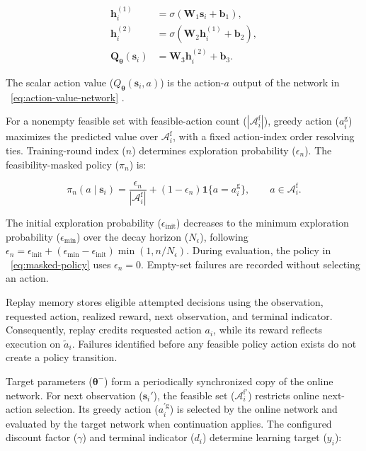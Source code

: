 \documentclass[journal]{IEEEtran}
\providecommand*{\algorithmautorefname}{Algorithm}
\providecommand*{\figureautorefname}{Figure}
\providecommand*{\subfigureautorefname}{Figure}
\providecommand*{\Autoref}[1]{%
  \begingroup
  \def\sectionautorefname{Section}%
  \def\subsectionautorefname{Subsection}%
  \def\subsubsectionautorefname{Subsubsection}%
  \def\algorithmautorefname{Algorithm}%
  \def\figureautorefname{Figure}%
  \def\subfigureautorefname{Figure}%
 ~\autoref{#1}%
  \endgroup
}
\newcommand{\Autoref}[1]{Eq.~\Autoref{#1}}
\begin{document}
\begin{equation}
\label{eq:action-value-network}
\begin{aligned}
\mathbf h_i^{(1)}
&=\sigma(\mathbf W_1\mathbf s_i+\mathbf b_1),\\
\mathbf h_i^{(2)}
&=\sigma(\mathbf W_2\mathbf h_i^{(1)}+\mathbf b_2),\\
\mathbf Q_{\boldsymbol\theta}(\mathbf s_i)
&=\mathbf W_3\mathbf h_i^{(2)}+\mathbf b_3.
\end{aligned}
\end{equation}

The scalar action value (\(Q_{\boldsymbol\theta}(\mathbf s_i,a)\)) is the action-\(a\) output of the network in~\Autoref{eq:action-value-network}.

For a nonempty feasible set with feasible-action count (\(|\mathcal A_i^{\mathrm f}|\)), greedy action (\(a_i^{\mathrm g}\)) maximizes the predicted value over \(\mathcal A_i^{\mathrm f}\), with a fixed action-index order resolving ties. Training-round index (\(n\)) determines exploration probability (\(\epsilon_n\)). The feasibility-masked policy (\(\pi_n\)) is:

\begin{equation}
\label{eq:masked-policy}
\pi_n(a\mid\mathbf s_i)
=
\frac{\epsilon_n}{|\mathcal A_i^{\mathrm f}|}
+
(1-\epsilon_n)\mathbf1\{a=a_i^{\mathrm g}\},
\qquad a\in\mathcal A_i^{\mathrm f}.
\end{equation}

The initial exploration probability (\(\epsilon_{\mathrm{init}}\)) decreases to the minimum exploration probability (\(\epsilon_{\min}\)) over the decay horizon (\(N_\epsilon\)), following \(\epsilon_n=\epsilon_{\mathrm{init}}+(\epsilon_{\min}-\epsilon_{\mathrm{init}})\min(1,n/N_\epsilon)\). During evaluation, the policy in~\Autoref{eq:masked-policy} uses \(\epsilon_n=0\). Empty-set failures are recorded without selecting an action.

Replay memory stores eligible attempted decisions using the observation, requested action, realized reward, next observation, and terminal indicator. Consequently, replay credits requested action \(a_i\), while its reward reflects execution on \(\tilde a_i\). Failures identified before any feasible policy action exists do not create a policy transition.

Target parameters (\(\boldsymbol\theta^{-}\)) form a periodically synchronized copy of the online network. For next observation (\(\mathbf s_i'\)), the feasible set (\(\mathcal A_i^{\mathrm f\prime}\)) restricts online next-action selection. Its greedy action (\(a_i^{\prime\mathrm g}\)) is selected by the online network and evaluated by the target network when continuation applies. The configured discount factor (\(\gamma\)) and terminal indicator (\(d_i\)) determine learning target (\(y_i\)):
\end{document}

